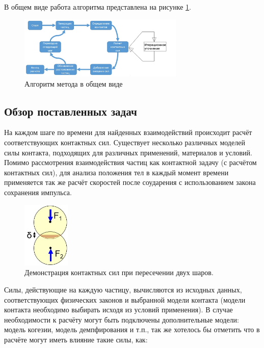 \documentclass[a4paper]{article}
\begin{document}
В общем виде работа алгоритма представлена на рисунке \ref{pic:algo}.

\begin{figure}[h!]
	\centering
	\includegraphics[width=0.7\textwidth]{algorithm}
	\caption{Алгоритм метода в общем виде}
	\label{pic:algo}
\end{figure} 

\subsection{Обзор поставленных задач}

На каждом шаге по времени для найденных взаимодействий происходит расчёт соответствующих контактных сил.
Существует несколько различных моделей силы контакта, подходящих для различных применений, материалов и условий.
Помимо рассмотрения взаимодействия частиц как контактной задачу (с расчётом контактных сил), для анализа положения тел в каждый момент времени применяется так же расчёт скоростей после соударения с использованием закона сохранения импульса.

\begin{figure}[h!]
	\centering
	\includegraphics[width=0.2\textwidth]{vhod}
	\caption{Демонстрация контактных сил при пересечении двух шаров.}
\end{figure} 

Силы, действующие на каждую частицу, вычисляются из исходных данных, соответствующих физических законов и выбранной модели контакта (модели контакта необходимо выбирать исходя из условий применения). 
В случае необходимости к расчёту могут быть подключены дополнительные модели: модель когезии, модель демпфирования и т.п., так же хотелось бы отметить что в расчёте могут иметь влияние такие силы, как:
\end{document}
